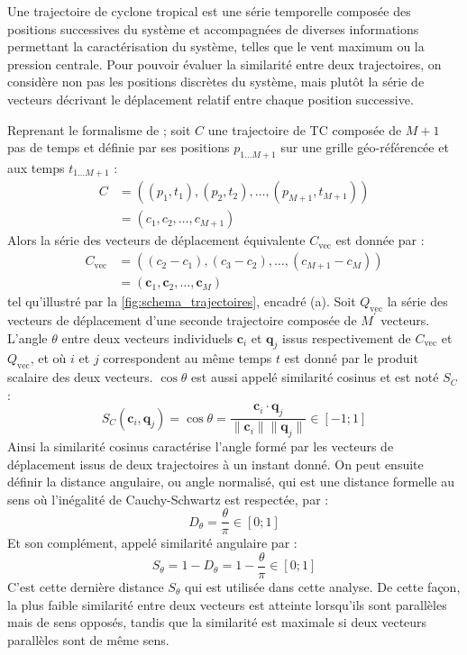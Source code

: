 \documentclass[../main.tex]{subfiles}
\begin{document}
Une trajectoire de cyclone tropical est une série temporelle composée des positions successives du système et accompagnées de diverses informations permettant
la caractérisation du système, telles que le vent maximum ou la pression centrale. Pour pouvoir évaluer la similarité entre deux trajectoires, on considère non
pas les positions discrètes du système, mais plutôt la série de vecteurs décrivant le déplacement relatif entre chaque position successive.

Reprenant le formalisme de \textcite{nakamura_shapebased_2013} ; soit $C$ une trajectoire de TC composée de $M+1$ pas de temps et définie par ses positions
$p_{1...M+1}$ sur une grille géo-référencée et aux temps $t_{1...M+1}$ :
%
\begin{align*}
    C &= ((p_1, t_1), (p_2, t_2), \ldots, (p_{M+1}, t_{M+1}))\\
      &= (c_1, c_2, \ldots, c_{M+1})
\end{align*}
%
Alors la série des vecteurs de déplacement équivalente $C_{\text{vec}}$ est donnée par :
\begin{align*}
    C_{\text{vec}} &= ((c_2 - c_1), (c_3 - c_2), \ldots, (c_{M+1} - c_M))\\
            &= (\mathbf{c}_1, \mathbf{c}_2, \ldots, \mathbf{c}_M)
\end{align*}
%
tel qu'illustré par la \cref{fig:schema_trajectoires}, encadré (a). Soit $Q_{\text{vec}}$ la série des vecteurs de déplacement d'une seconde trajectoire
composée de $M^\prime$ vecteurs. L'angle $\theta$ entre deux vecteurs individuels $\mathbf{c}_i$ et $\mathbf{q}_j$ issus respectivement de $C_{\text{vec}}$ et
$Q_{\text{vec}}$, et où $i$ et $j$ correspondent au même temps $t$ est donné par le produit scalaire des deux vecteurs. $\cos \theta$ est aussi appelé
similarité cosinus et est noté $S_C$ :
%
\begin{equation*}
    S_C(\mathbf{c}_i, \mathbf{q}_j) = \cos \theta = \frac{\mathbf{c}_i \cdot \mathbf{q}_j}{\lVert \mathbf{c}_i \rVert \lVert \mathbf{q}_j \rVert} \in [-1; 1] 
\end{equation*}
%
Ainsi la similarité cosinus caractérise l'angle formé par les vecteurs de déplacement issus de deux trajectoires à un instant donné. On peut ensuite définir la
distance angulaire, ou angle normalisé, qui est une distance formelle au sens où l'inégalité de Cauchy-Schwartz est respectée, par :
%
\begin{equation*}
    D_\theta = \frac{\theta}{\pi} \in [0; 1]
\end{equation*}
%
Et son complément, appelé similarité angulaire par :
%
\begin{equation*}
    S_\theta = 1 - D_\theta = 1 - \frac{\theta}{\pi} \in [0; 1]
\end{equation*}
%
C'est cette dernière distance $S_\theta$ qui est utilisée dans cette analyse. De cette façon, la plus faible similarité entre deux vecteurs est atteinte
lorsqu'ils sont parallèles mais de sens opposés, tandis que la similarité est maximale si deux vecteurs parallèles sont de même sens.
\end{document}
